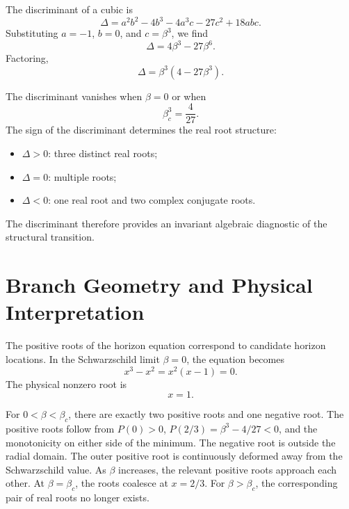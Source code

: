 \documentclass[11pt,a4paper]{article}
\begin{document}
The discriminant of a cubic is
\begin{equation}
\Delta
=
a^2b^2
-4b^3
-4a^3c
-27c^2
+18abc.
\label{eq:cubic_discriminant}
\end{equation}
Substituting \(a=-1\), \(b=0\), and \(c=\beta^3\), we find
\begin{equation}
\Delta=4\beta^3-27\beta^6.
\label{eq:discriminant_beta}
\end{equation}
Factoring,
\begin{equation}
\Delta=\beta^3(4-27\beta^3).
\label{eq:discriminant_factored}
\end{equation}

The discriminant vanishes when \(\beta=0\) or when
\begin{equation}
\beta_c^3=\frac{4}{27}.
\end{equation}
The sign of the discriminant determines the real root structure:
\begin{itemize}
\item \(\Delta>0\): three distinct real roots;
\item \(\Delta=0\): multiple roots;
\item \(\Delta<0\): one real root and two complex conjugate roots.
\end{itemize}

The discriminant therefore provides an invariant algebraic diagnostic of the
structural transition.

\section{Branch Geometry and Physical Interpretation}

The positive roots of the horizon equation correspond to candidate horizon
locations. In the Schwarzschild limit \(\beta=0\), the equation becomes
\begin{equation}
x^3-x^2=x^2(x-1)=0.
\end{equation}
The physical nonzero root is
\begin{equation}
x=1.
\end{equation}

For \(0<\beta<\beta_c\), there are exactly two positive roots and one negative
root. The positive roots follow from \(P(0)>0\),
\(P(2/3)=\beta^3-4/27<0\), and the monotonicity on either side of the minimum.
The negative root is outside the radial domain. The outer positive root is
continuously deformed away from the Schwarzschild value. As \(\beta\) increases, the relevant positive roots
approach each other. At \(\beta=\beta_c\), the roots coalesce at \(x=2/3\).
For \(\beta>\beta_c\), the corresponding pair of real roots no longer exists.
\end{document}
